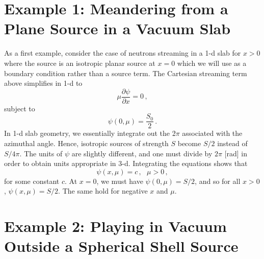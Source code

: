 \section*{Example 1: Meandering from a Plane Source in a Vacuum Slab}

As a first example, consider the case of neutrons streaming in a 1-d slab for $x>0$ where the source is an isotropic planar source at $x=0$ which we will use as a boundary condition rather than a source term. The Cartesian streaming term above simplifies in 1-d to
\begin{equation}
 \mu \frac{\partial \psi}{\partial x} = 0 \, ,
\end{equation}
subject to
\begin{equation}
 \psi(0,\mu) = \frac{S_0}{2} \, .
\end{equation}
In 1-d slab geometry, we essentially integrate out the 2$\pi$ associated with the azimuthal angle.  Hence, isotropic sources of strength $S$ become $S/2$ instead of $S/4\pi$.  The units of $\psi$ are slightly different, and one must divide by $2\pi$ [rad] in order to obtain units appropriate in 3-d.  Integrating the equations shows that
\begin{equation}
 \psi(x,\mu) = c \, , \, \, \, \, \mu > 0 \, ,
\end{equation}
for some constant $c$.  At $x = 0$, we must have $\psi(0,\mu) = S/2$, and so for all $x > 0$, $\psi(x,\mu) = S/2$.  The same hold for negative $x$ and $\mu$.

\section*{Example 2: Playing in Vacuum Outside a Spherical Shell Source}

